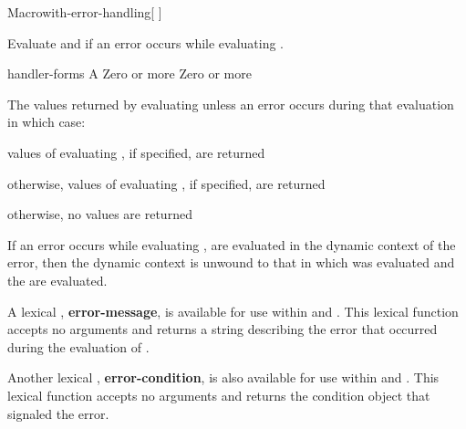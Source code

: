 \documentclass[10pt,twoside,english,pdftex]{article}
\begin{document}
\begin{functiondoc}{Macro}{with-error-handling}{[ \vbar{}
    \code{(}\superstar{}\code{)}]
    \superstar{} 
    \returns{} \superstar} 
%
%
%  
%  
\fnsyntax

\fnpurpose Evaluate  and  if an error
occurs while evaluating .

\fnpackage {}

\fnmodule {}

\fnargs
\begin{args}{handler-forms}
\arg[form] A 
 Zero or more 
 Zero or more 
\end{args}

\fnreturns The values returned by evaluating  unless an
error occurs during that evaluation in which case:
\begin{tightitemize}
\item values of evaluating , if specified, are returned
\item otherwise, values of evaluating , if specified, are returned
\item otherwise, no values are returned
\end{tightitemize}

\fndescription If an error occurs while evaluating ,
 are evaluated in the dynamic context of the error, then
the dynamic context is unwound to that in which  was evaluated and
the  are evaluated.

A lexical , \textbf{error-message}, is available for use
within  and .  This lexical function
accepts no arguments and returns a string describing the error that occurred
during the evaluation of .

Another lexical , \textbf{error-condition}, is also available for use
within  and .  This lexical function
accepts no arguments and returns the condition object that signaled the error.


\end{functiondoc}
\end{document}
